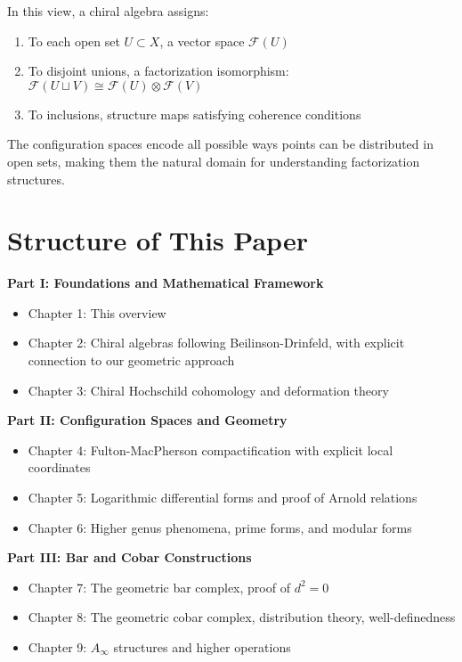 In this view, a chiral algebra assigns:
\begin{enumerate}
\item To each open set $U \subset X$, a vector space $\mathcal{F}(U)$
\item To disjoint unions, a factorization isomorphism: $\mathcal{F}(U \sqcup V) \cong \mathcal{F}(U) \otimes \mathcal{F}(V)$
\item To inclusions, structure maps satisfying coherence conditions
\end{enumerate}

The configuration spaces encode all possible ways points can be distributed in open sets, making them the natural domain for understanding factorization structures.





\section{Structure of This Paper}

\textbf{Part I: Foundations and Mathematical Framework}
\begin{itemize}
\item Chapter 1: This overview
\item Chapter 2: Chiral algebras following Beilinson-Drinfeld, with explicit connection to our geometric approach
\item Chapter 3: Chiral Hochschild cohomology and deformation theory
\end{itemize}

\textbf{Part II: Configuration Spaces and Geometry}
\begin{itemize}
\item Chapter 4: Fulton-MacPherson compactification with explicit local coordinates
\item Chapter 5: Logarithmic differential forms and proof of Arnold relations
\item Chapter 6: Higher genus phenomena, prime forms, and modular forms
\end{itemize}

\textbf{Part III: Bar and Cobar Constructions}
\begin{itemize}
\item Chapter 7: The geometric bar complex, proof of $d^2 = 0$
\item Chapter 8: The geometric cobar complex, distribution theory, well-definedness
\item Chapter 9: $A_\infty$ structures and higher operations
\end{itemize}

